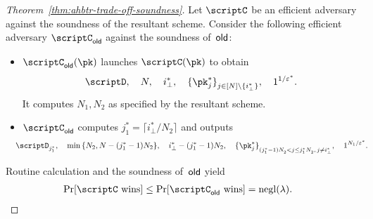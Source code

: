 \begin{proof}
[%
Theorem~\ref{thm:ahbtr-trade-off-soundness}]
Let $\scriptC$ be an efficient adversary against the soundness of the resultant scheme.
Consider the following efficient adversary $\scriptC_\OLD$ against the soundness of~$\OLD$:
\begin{itemize}
\item $\scriptC_\OLD(\pk)$ launches $\scriptC(\pk)$ to obtain
\begin{align*}
\scriptD,\quad
N,\quad
i^\ast_\bot,\quad
\{\pk^\ast_j\}_{j\in{[N]\setminus\{i^\ast_\bot\}}}^\sphantom,\quad
1^{1/\epsilon^\ast}.
\end{align*}
It computes $N_1,N_2$ as specified by the resultant scheme.
\item $\scriptC_\OLD$ computes ${j^\ast_1=\lceil i^\ast_\bot/N_2\rceil}$
and outputs
\begin{align*}
\WideNarrow{\hspace*{-1em}}{}
\scriptD_{j^\ast_1},\quad
&{}\min{\{N_2,N-(j^\ast_1-1)N_2\}},\quad
i^\ast_\bot-(j^\ast_1-1)N_2,
\WideNarrow{\quad}{\\&}
\{\pk^\ast_j\}_{(j^\ast_1-1)N_2^\sphantom<j\leq j^\ast_1N_2^\sphantom,\,j\neq i^\ast_\bot}^\sphantom,\quad
1^{N_1/\epsilon^\ast}.
\end{align*}
\end{itemize}
Routine calculation and the soundness of~$\OLD$ yield
\begin{align*}
\Pr[\scriptC\textup{ wins}]
&{}\leq
\Pr[\scriptC_\OLD\textup{ wins}]
=
\negl(\lambda).
\qedhere
\end{align*}
\end{proof}
